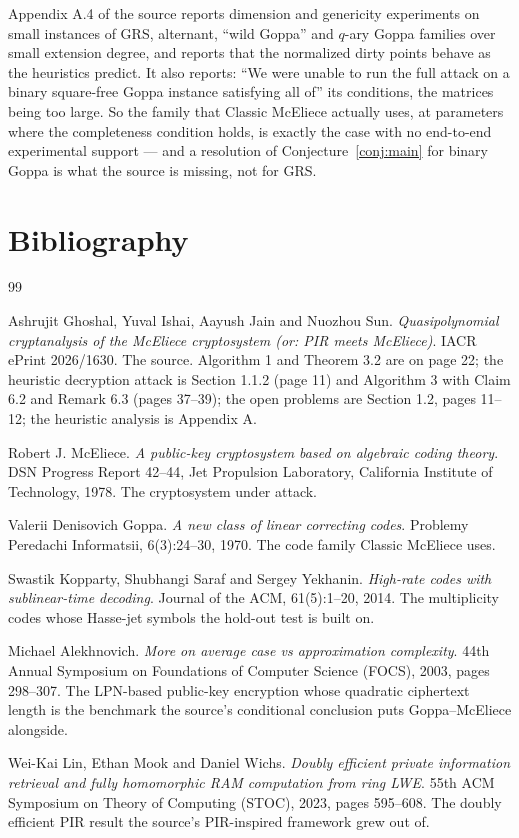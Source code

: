 \documentclass{aicr-conjecture}
\begin{document}
\begin{remark}
Appendix A.4 of the source reports dimension and genericity experiments
on small instances of GRS, alternant, ``wild Goppa'' and $q$-ary Goppa
families over small extension degree, and reports that the normalized
dirty points behave as the heuristics predict. It also reports: ``We
were unable to run the full attack on a binary square-free Goppa
instance satisfying all of'' its conditions, the matrices being too
large. So the family that Classic McEliece actually uses, at parameters
where the completeness condition holds, is exactly the case with no
end-to-end experimental support --- and a resolution of
Conjecture~\ref{conj:main} for binary Goppa is what the source is
missing, not for GRS\@.
\end{remark}

\section{Bibliography}

\begin{aicrbibliography}{99}

Ashrujit Ghoshal, Yuval Ishai, Aayush Jain and Nuozhou Sun.
\emph{Quasipolynomial cryptanalysis of the McEliece cryptosystem
(or: PIR meets McEliece)}.
IACR ePrint 2026/1630.
The source. Algorithm 1 and Theorem 3.2 are on page 22; the heuristic
decryption attack is Section 1.1.2 (page 11) and Algorithm 3 with
Claim 6.2 and Remark 6.3 (pages 37--39); the open problems are
Section 1.2, pages 11--12; the heuristic analysis is Appendix A.

Robert J. McEliece.
\emph{A public-key cryptosystem based on algebraic coding theory}.
DSN Progress Report 42--44, Jet Propulsion Laboratory, California
Institute of Technology, 1978.
The cryptosystem under attack.

Valerii Denisovich Goppa.
\emph{A new class of linear correcting codes}.
Problemy Peredachi Informatsii, 6(3):24--30, 1970.
The code family Classic McEliece uses.

Swastik Kopparty, Shubhangi Saraf and Sergey Yekhanin.
\emph{High-rate codes with sublinear-time decoding}.
Journal of the ACM, 61(5):1--20, 2014.
The multiplicity codes whose Hasse-jet symbols the hold-out test is built
on.

Michael Alekhnovich.
\emph{More on average case vs approximation complexity}.
44th Annual Symposium on Foundations of Computer Science (FOCS), 2003,
pages 298--307.
The LPN-based public-key encryption whose quadratic ciphertext length is
the benchmark the source's conditional conclusion puts Goppa--McEliece
alongside.

Wei-Kai Lin, Ethan Mook and Daniel Wichs.
\emph{Doubly efficient private information retrieval and fully
homomorphic RAM computation from ring LWE}.
55th ACM Symposium on Theory of Computing (STOC), 2023, pages 595--608.
The doubly efficient PIR result the source's PIR-inspired framework grew
out of.

\end{aicrbibliography}
\end{document}
